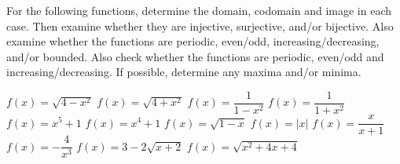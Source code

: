 \begin{Exercise} For the following functions, determine the domain, codomain and image in each case. Then examine whether they are injective, surjective, and/or bijective. \ifanalysis Also examine whether the functions are periodic, even/odd, increasing/decreasing, and/or bounded. \fi \ifcalculus Also check whether the functions are periodic, even/odd and increasing/decreasing. \fi If possible, determine any maxima and/or minima.
	 \begin{multicols}{2}
			\Question[difficulty = 1] $f(x)=\sqrt{4-x^2}$
			\Question[difficulty = 1] $f(x)=\sqrt{4+x^2}$
			\Question[difficulty = 1] $f(x)=\dfrac{1}{1-x^2}$
			\Question[difficulty = 1] $f(x)=\dfrac{1}{1+x^2}$
			\Question[difficulty = 1] $f(x)=x^5+1$
			\Question[difficulty = 1] $f(x)=x^4+1$
			\Question[difficulty = 1] $f(x)=\sqrt{1-x}$
			\Question[difficulty = 1] $f(x)=|x|$
			\Question[difficulty = 1] $f(x)=\dfrac{x}{x+1}$
    	    \Question[difficulty = 1] $f(x) = -\dfrac{4}{x^3}$
        	\Question[difficulty = 1] $f(x) = 3-2\sqrt{x+2}$
        	\Question[difficulty = 2] $f(x)=\sqrt{x^2+4x+4}$
        	\EndCurrentQuestion
	\end{multicols}
\end{Exercise}

